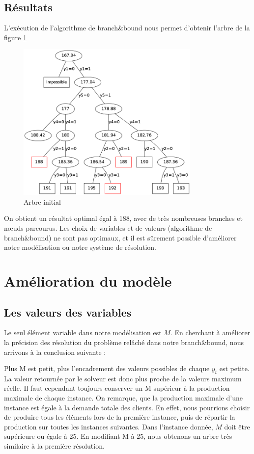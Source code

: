 \documentclass[a4paper,11pt,twoside]{report}
\begin{document}
\section{Résultats}
L'exécution de l'algorithme de branch\&bound nous permet d'obtenir l'arbre de la figure \ref{graph1}
\begin{figure}[h]
 \centering
 \includegraphics[width=0.8\textwidth]{graph1.png}
 \caption{Arbre initial}
 \label{graph1}
\end{figure}

On obtient un résultat optimal égal à 188, avec de très nombreuses branches et n\oe{}uds parcourus. Les choix de variables et de valeurs (algorithme de branch\&bound) ne sont pas optimaux, et il est sûrement possible d'améliorer notre modélisation ou notre système de résolution.
\chapter{Amélioration du modèle}
\section{Les valeurs des variables}
Le seul élément variable dans notre modélisation est $M$. En cherchant à améliorer la précision des résolution du problème relâché dans notre branch\&bound, nous arrivons à la conclusion suivante :

Plus M est petit, plus l'encadrement des valeurs possibles de chaque $y_t$ est petite. La valeur retournée par le solveur est donc plus proche de la valeurs maximum réelle.
Il faut cependant toujours conserver un M supérieur à la production maximale de chaque instance. On remarque, que la production maximale d'une instance est égale à la demande totale des clients. En effet, nous pourrions choisir de produire tous les éléments lors de la première instance, puis de répartir la production sur toutes les instances suivantes.
Dans l'instance donnée, $M$ doit être supérieure ou égale à 25. En modifiant M à 25, nous obtenons un arbre très similaire à la première résolution.
\end{document}
